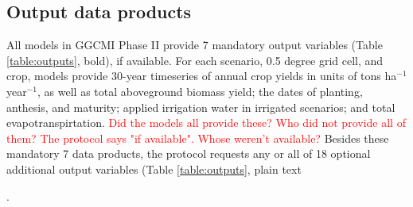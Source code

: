 \documentclass[gmd, manuscript]{copernicus} %
\begin{document}
{\subsection{Output data products}
All models in GGCMI Phase II provide 7 mandatory output variables (Table \ref{table:outputs}, bold), if available. For each scenario, 0.5 degree grid cell, and crop, models provide 30-year timeseries of annual crop yields in units of tons ha$^{-1}$ year$^{-1}$, as well as total aboveground biomass yield; the dates of planting, anthesis, and maturity; applied irrigation water in irrigated scenarios; and total evapotranspirtation. \textcolor{red}{Did the models all provide these? Who did not provide all of them? The protocol says "if available". Whose weren't available?}
  Besides these mandatory 7 data products, the protocol requests any or all of 18 optional additional output variables (Table \ref{table:outputs}, plain text}.
\end{document}

